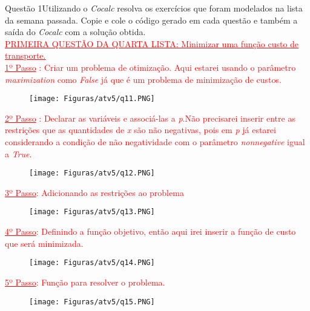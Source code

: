 \documentclass[12pt]{article}
\begin{document}
\begin{section}{Questão 1}{Utilizando o \textit{Cocalc} resolva os exercícios que foram modelados na lista da semana passada. Copie e cole
o código gerado em cada questão e também a saída do \textit{Cocalc} com a solução obtida.}\\

\noindent \textcolor{red}{\underline{\underline{PRIMEIRA QUESTÃO DA QUARTA LISTA: Minimizar uma função custo de transporte.}}}\\

\noindent \textcolor{red}{\underline{1º Passo} : Criar um problema de otimização. Aqui estarei usando o parâmetro \textit{maximization} como \textit{False} já que é um problema de minimização de custos.}

\begin{figure}[H]
    \centering
    \texttt{[image: Figuras/atv5/q11.PNG]}
\end{figure}

\noindent \textcolor{red}{\underline{2º Passo} : Declarar as variáveis e associá-las a \textit{p}.Não precisarei inserir entre as restrições que as quantidades de \textit{x} são não negativas, pois em \textit{p} já estarei considerando a condição de não negatividade com o parâmetro \textit{nonnegative} igual a \textit{True}.}\\

\begin{figure}[H]
    \centering
    \texttt{[image: Figuras/atv5/q12.PNG]}
\end{figure}

\noindent \textcolor{red}{\underline{3º Passo}: Adicionando as restrições ao problema}

\begin{figure}[H]
    \centering
    \texttt{[image: Figuras/atv5/q13.PNG]}
\end{figure}

\noindent \textcolor{red}{\underline{4º Passo}: Definindo a função objetivo, então aqui irei inserir a função de custo que será minimizada.}

\begin{figure}[H]
    \centering
    \texttt{[image: Figuras/atv5/q14.PNG]}
\end{figure}

\noindent \textcolor{red}{\underline{5º Passo}: Função para resolver o problema.}

\begin{figure}[H]
    \centering
    \texttt{[image: Figuras/atv5/q15.PNG]}
\end{figure}


\end{section}
\end{document}
